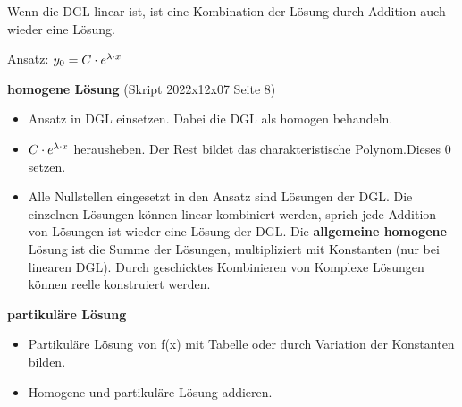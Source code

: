 
Wenn die DGL linear ist, ist eine Kombination der Lösung durch Addition auch wieder eine Lösung.

Ansatz: $y_0=C\cdot e^{\lambda \cdot x}$

\textbf{homogene Lösung} (Skript 2022x12x07 Seite 8)
\begin{itemize}
    \item Ansatz in DGL einsetzen. Dabei die DGL als homogen behandeln.
    \item $C\cdot e^{\lambda \cdot x}$ herausheben. Der Rest bildet das charakteristische Polynom.Dieses 0 setzen.
    \item Alle Nullstellen eingesetzt in den Ansatz sind Lösungen der DGL. Die einzelnen Lösungen können linear kombiniert werden, sprich jede Addition von Lösungen ist wieder eine Lösung der DGL. Die \textbf{allgemeine homogene} Lösung ist die Summe der Lösungen, multipliziert mit Konstanten (nur bei linearen DGL). Durch geschicktes Kombinieren von Komplexe Lösungen können reelle konstruiert werden.
\end{itemize}

\textbf{partikuläre Lösung}
\begin{itemize}
    \item Partikuläre Lösung von f(x) mit Tabelle oder durch Variation der Konstanten bilden.
    \item Homogene und partikuläre Lösung addieren.    
\end{itemize}



